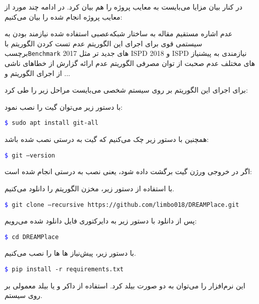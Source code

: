 در کنار بیان مزایا می‌بایست به معایب پروژه را هم بیان کرد. در ادامه چند مورد از معایب پروژه انجام شده را بیان می‌کنیم:

 عدم اشاره مستقیم مقاله به ساختار شبکه‌عصبی استفاده شده
 نیازمند بودن به سیستمی قوی برای اجرای این الگوریتم
 عدم تست کردن الگوریتم با برچسب‌\texttt{Benchmark} های جدید تر مثل 2017 ISPD و 2018 ISPD
 نیازمندی به پیشنیاز های مختلف
 عدم صحبت از توان مصرفی الگوریتم
 عدم ارائه گزارش از خطا‌های ناشی از اجرای الگوریتم
 و ...






برای اجرای این الگوریتم بر روی سیستم شخصی می‌بایست مراحل زیر را طی کرد:

با دستور زیر می‌توان گیت را نصب نمود:
\begin{latin}
	\texttt{\textcolor{blue}{\$} sudo apt install git-all}
\end{latin}

همچنین با دستور زیر چک می‌کنیم که گیت به درستی نصب شده باشد:
\begin{latin}
	\texttt{\textcolor{blue}{\$} git --version}
\end{latin}

اگر در خروجی ورژن گیت برگشت داده شود، یعنی نصب به درستی انجام شده است:



با استفاده از دستور زیر، مخزن الگوریتم را دانلود می‌کنیم.
\begin{latin}
	\texttt{\textcolor{blue}{\$} git clone --recursive https://github.com/limbo018/DREAMPlace.git}
\end{latin}

پس از دانلود با دستور زیر به دایرکتوری فایل دانلود شده می‌رویم:
\begin{latin}
	\texttt{\textcolor{blue}{\$} cd DREAMPlace}
\end{latin}

با دستور زیر، پیش‌نیاز ها ها را نصب می‌کنیم.
\begin{latin}
	\texttt{\textcolor{blue}{\$} pip install -r requirements.txt}
\end{latin}

این نرم‌افزار را می‌توان به دو صورت بیلد کرد. استفاده از داکر و یا بیلد معمولی بر روی سیستم.

